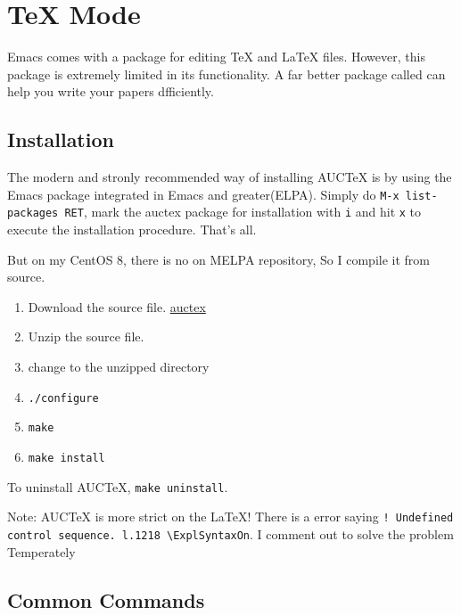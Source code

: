 \chapter{TeX Mode}
Emacs comes with a package for editing TeX and LaTeX files. However, this package is extremely limited in its functionality. A far better package called  can help you write your papers dfficiently.

\section{Installation}
The modern and stronly recommended way of installing AUCTeX is by using the Emacs package integrated in Emacs and greater(ELPA). Simply do \verb|M-x list-packages RET|, mark the auctex package for installation with \verb|i| and hit \verb|x| to execute the installation procedure. That's all.

But on my CentOS 8, there is no  on MELPA repository, So I compile it from source.

\begin{enumerate}
\item Download the source file. \href{http://ftp.gnu.org/pub/gnu/auctex/auctex-12.2.zip}{auctex}
\item Unzip the source file.
\item change to the unzipped directory
\item \verb|./configure|
\item \verb|make|
\item \verb|make install|
\end{enumerate}


To uninstall AUCTeX, \verb|make uninstall|.


\begin{tcolorbox}
  Note: AUCTeX is more strict on the \LaTeX !
  There is a error saying \verb|! Undefined control sequence. l.1218 \ExplSyntaxOn|.
  I comment  out to solve the problem Temperately
\end{tcolorbox}


\section{Common Commands}

